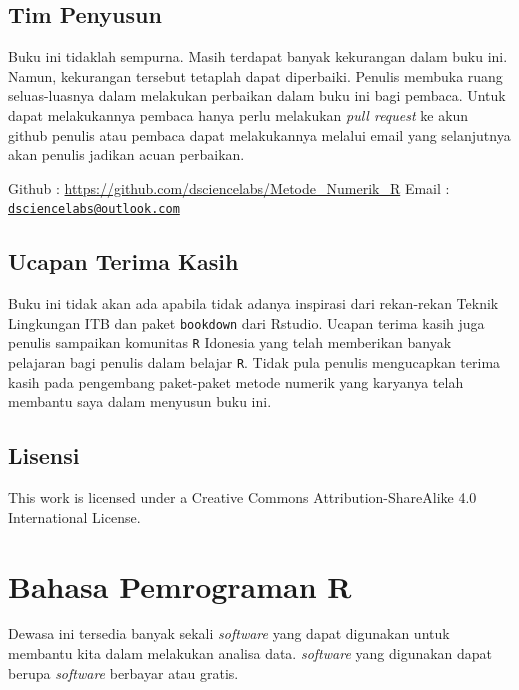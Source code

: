 \documentclass[
]{book}
\theoremstyle{definition}
\theoremstyle{definition}
\theoremstyle{definition}
\theoremstyle{definition}
\theoremstyle{remark}
\begin{document}
\hypertarget{tim-penyusun}{%
\section*{Tim Penyusun}\label{tim-penyusun}}

Buku ini tidaklah sempurna. Masih terdapat banyak kekurangan dalam buku ini. Namun, kekurangan tersebut tetaplah dapat diperbaiki. Penulis membuka ruang seluas-luasnya dalam melakukan perbaikan dalam buku ini bagi pembaca. Untuk dapat melakukannya pembaca hanya perlu melakukan \emph{pull request} ke akun github penulis atau pembaca dapat melakukannya melalui email yang selanjutnya akan penulis jadikan acuan perbaikan.

Github : \url{https://github.com/dsciencelabs/Metode_Numerik_R}
Email : \href{mailto:dsciencelabs@outlook.com}{\nolinkurl{dsciencelabs@outlook.com}}

\hypertarget{ucapan-terima-kasih}{%
\section*{Ucapan Terima Kasih}\label{ucapan-terima-kasih}}

Buku ini tidak akan ada apabila tidak adanya inspirasi dari rekan-rekan Teknik Lingkungan ITB dan paket \texttt{bookdown} dari Rstudio. Ucapan terima kasih juga penulis sampaikan komunitas \texttt{R} Idonesia yang telah memberikan banyak pelajaran bagi penulis dalam belajar \texttt{R}. Tidak pula penulis mengucapkan terima kasih pada pengembang paket-paket metode numerik yang karyanya telah membantu saya dalam menyusun buku ini.

\hypertarget{lisensi}{%
\section*{Lisensi}\label{lisensi}}

This
work is licensed under a
Creative
Commons Attribution-ShareAlike 4.0 International License.

\hypertarget{intro}{%
\chapter{Bahasa Pemrograman R}\label{intro}}

Dewasa ini tersedia banyak sekali \emph{software} yang dapat digunakan untuk membantu kita dalam melakukan analisa data. \emph{software} yang digunakan dapat berupa \emph{software} berbayar atau gratis.
\end{document}
